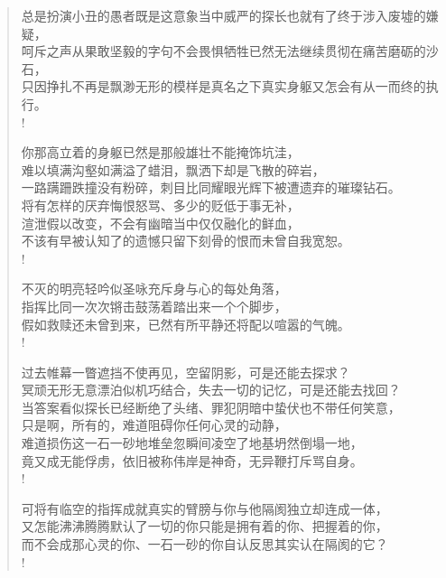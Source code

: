 \documentclass[UTF8, 12pt, a4paper]{ctexrep} %
\begin{document}
\begin{verse}
总是扮演小丑的愚者既是这意象当中威严的探长也就有了终于涉入废墟的嫌疑，\\
呵斥之声从果敢坚毅的字句不会畏惧牺牲已然无法继续贯彻在痛苦磨砺的沙石，\\
只因挣扎不再是飘渺无形的模样是真名之下真实身躯又怎会有从一而终的执行。\\!

你那高立着的身躯已然是那般雄壮不能掩饰坑洼，\\
难以填满沟壑如满溢了蜡泪，飘洒下却是飞散的碎岩，\\
一路蹒跚跌撞没有粉碎，刺目比同耀眼光辉下被遭遗弃的璀璨钻石。\\
将有怎样的厌弃悔恨怒骂、多少的贬低于事无补，\\
渲泄假以改变，不会有幽暗当中仅仅融化的鲜血，\\
不该有早被认知了的遗憾只留下刻骨的恨而未曾自我宽恕。\\!

不灭的明亮轻吟似圣咏充斥身与心的每处角落，\\
指挥比同一次次锵击鼓荡着踏出来一个个脚步，\\
假如救赎还未曾到来，已然有所平静还将配以喧嚣的气魄。\\!

过去帷幕一瞥遮挡不使再见，空留阴影，可是还能去探求？\\
冥顽无形无意漂泊似机巧结合，失去一切的记忆，可是还能去找回？\\
当答案看似探长已经断绝了头绪、罪犯阴暗中蛰伏也不带任何笑意，\\
只是啊，所有的，难道阻碍你任何心灵的动静，\\
难道损伤这一石一砂地堆垒忽瞬间凌空了地基坍然倒塌一地，\\
竟又成无能俘虏，依旧被称伟岸是神奇，无异鞭打斥骂自身。\\!

可将有临空的指挥成就真实的臂膀与你与他隔阂独立却连成一体，\\
又怎能沸沸腾腾默认了一切的你只能是拥有着的你、把握着的你，\\
而不会成那心灵的你、一石一砂的你自认反思其实认在隔阂的它？\\!

\end{verse}
\end{document}
